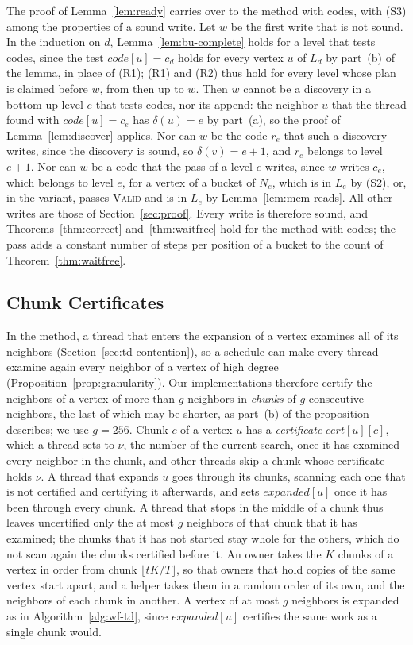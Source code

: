 The proof of Lemma~\ref{lem:ready} carries over to the method with codes, with (S3) among the properties of a sound write. Let $w$ be the first write that is not sound. In the induction on $d$, Lemma~\ref{lem:bu-complete} holds for a level that tests codes, since the test $\mathit{code}[u] = c_d$ holds for every vertex $u$ of $L_d$ by part~(b) of the lemma, in place of (R1); (R1) and (R2) thus hold for every level whose plan is claimed before $w$, from then up to $w$. Then $w$ cannot be a discovery in a bottom-up level $e$ that tests codes, nor its append: the neighbor $u$ that the thread found with $\mathit{code}[u] = c_e$ has $\delta(u) = e$ by part~(a), so the proof of Lemma~\ref{lem:discover} applies. Nor can $w$ be the code $r_e$ that such a discovery writes, since the discovery is sound, so $\delta(v) = e + 1$, and $r_e$ belongs to level $e + 1$. Nor can $w$ be a code that the pass of a level $e$ writes, since $w$ writes $c_e$, which belongs to level $e$, for a vertex of a bucket of $N_e$, which is in $L_e$ by (S2), or, in the variant, passes \textsc{Valid} and is in $L_e$ by Lemma~\ref{lem:mem-reads}. All other writes are those of Section~\ref{sec:proof}. Every write is therefore sound, and Theorems~\ref{thm:correct} and~\ref{thm:waitfree} hold for the method with codes; the pass adds a constant number of steps per position of a bucket to the count of Theorem~\ref{thm:waitfree}.

\subsection{Chunk Certificates}
\label{sec:impl-chunks}

In the method, a thread that enters the expansion of a vertex examines all of its neighbors (Section~\ref{sec:td-contention}), so a schedule can make every thread examine again every neighbor of a vertex of high degree (Proposition~\ref{prop:granularity}). Our implementations therefore certify the neighbors of a vertex of more than $g$ neighbors in \emph{chunks} of $g$ consecutive neighbors, the last of which may be shorter, as part~(b) of the proposition describes; we use $g = 256$. Chunk $c$ of a vertex $u$ has a \emph{certificate} $\mathit{cert}[u][c]$, which a thread sets to $\nu$, the number of the current search, once it has examined every neighbor in the chunk, and other threads skip a chunk whose certificate holds $\nu$. A thread that expands $u$ goes through its chunks, scanning each one that is not certified and certifying it afterwards, and sets $\mathit{expanded}[u]$ once it has been through every chunk. A thread that stops in the middle of a chunk thus leaves uncertified only the at most $g$ neighbors of that chunk that it has examined; the chunks that it has not started stay whole for the others, which do not scan again the chunks certified before it. An owner takes the $K$ chunks of a vertex in order from chunk $\lfloor tK/T \rfloor$, so that owners that hold copies of the same vertex start apart, and a helper takes them in a random order of its own, and the neighbors of each chunk in another. A vertex of at most $g$ neighbors is expanded as in Algorithm~\ref{alg:wf-td}, since $\mathit{expanded}[u]$ certifies the same work as a single chunk would.

